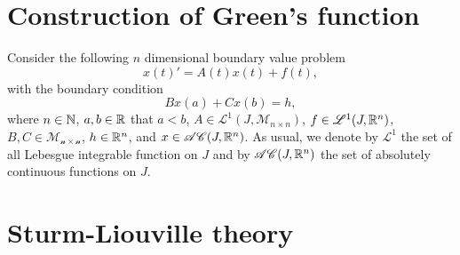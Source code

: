 \section{Construction of Green's function}
Consider the following $n$ dimensional boundary value problem
\[ x(t)' = A(t) x(t) + f(t), \]
with the boundary condition
\[ Bx(a) + Cx(b) = h, \]
where $n \in \mathbb{N}$, $a,b \in \mathbb{R}$ that $a<b$, $A \in \mathscr{L}^1(J,\mathscr{M}_{n\times n})$, $f \in \mathscr{L}^1(J,\mathbb{R}^n)$, $B,C \in \mathscr{M_{n\times n}}$, $h \in \mathbb{R}^n$, and $x \in \mathscr{AC}(J,\mathbb{R}^n)$. As usual, we denote by  $\mathscr{L}^1$ the set of all Lebesgue integrable function on $J$ and by $\mathscr{AC}(J,\mathbb{R}^n)$ the set of absolutely continuous functions on $J$.

\section{Sturm-Liouville theory}


